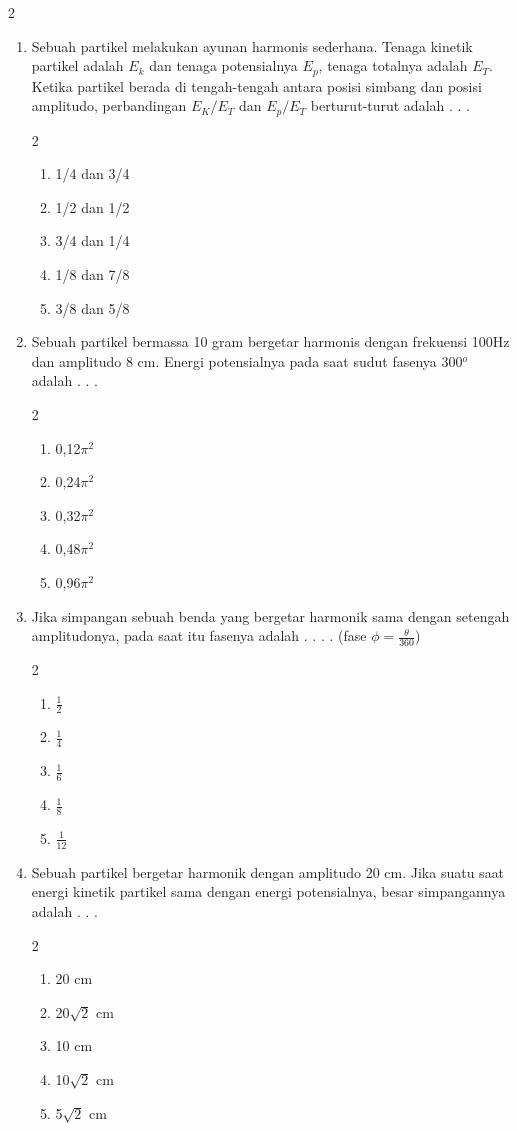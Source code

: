 \documentclass[10pt,a4paper]{extarticle}
\newcommand{\pilgani}[1]{                            \vspace{-0.3cm}\begin{multicols}{2}
 \begin{enumerate}[label=\Alph*., itemsep=0pt,topsep=0pt,leftmargin=*,align=Center]#1                     \end{enumerate}
 \phantom{ini cuma sapi, wedus, dan ayam}
 \end{multicols}}
\begin{document}
\begin{multicols*}{2}
\begin{enumerate}
\item Sebuah partikel melakukan ayunan harmonis sederhana. Tenaga kinetik partikel adalah $E_k$ dan tenaga potensialnya $E_p$, tenaga totalnya adalah $E_T$. Ketika partikel berada di tengah-tengah antara posisi simbang dan posisi amplitudo, perbandingan $E_K/E_T$ dan $E_p/E_T$ berturut-turut adalah . . .
\pilgani{
   \item 1/4 dan 3/4
   \item 1/2 dan 1/2
   \item 3/4 dan 1/4
   \item 1/8 dan 7/8
   \item 3/8 dan 5/8
}
\vspace{3cm}

\item Sebuah partikel bermassa 10 gram bergetar harmonis dengan frekuensi 100Hz dan amplitudo 8 cm. Energi potensialnya pada saat sudut fasenya 300$^o$ adalah . . . 
\pilgani{
   \item 0,12$\pi^2$
   \item 0,24$\pi^2$
   \item 0,32$\pi^2$
   \item 0,48$\pi^2$
   \item 0,96$\pi^2$}
\vspace{3cm}

\item Jika simpangan sebuah benda yang bergetar harmonik sama dengan setengah amplitudonya, pada saat itu fasenya adalah  . . . .  (fase $\phi=\frac{\theta}{360}$)
\pilgani{
   \item $\frac{1}{2}$
   \item $\frac{1}{4}$
   \item $\frac{1}{6}$
   \item $\frac{1}{8}$
   \item $\frac{1}{12}$}
   \vspace{3cm}

   \item Sebuah partikel bergetar harmonik dengan amplitudo 20 cm. Jika suatu saat energi kinetik partikel sama dengan energi potensialnya, besar simpangannya adalah . . .
   \pilgani{
      \item 20 cm
      \item 20$\sqrt{2}$ cm
      \item 10 cm
      \item 10$\sqrt{2}$ cm
      \item 5$\sqrt{2}$ cm
   }
   \vspace{2cm}


\end{enumerate}
\end{multicols*}
\end{document}
